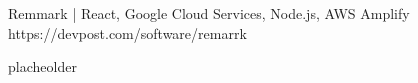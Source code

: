 


\begin{cventries}

  \cventry
	  {Remmark | React, Google Cloud Services, Node.js, AWS Amplify} %
    {} %
    {} %
    {https://devpost.com/software/remarrk} %
    {
      \begin{cvitems} %
        \item {placheolder}
      \end{cvitems}
    }





\end{cventries}
